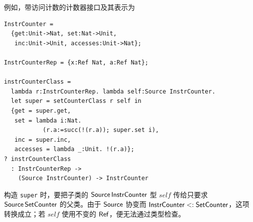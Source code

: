 例如，带访问计数的计数器接口及其表示为
\begin{lstlisting}
InstrCounter =
  {get:Unit->Nat, set:Nat->Unit,
   inc:Unit->Unit, accesses:Unit->Nat};

InstrCounterRep = {x:Ref Nat, a:Ref Nat};

instrCounterClass =
  lambda r:InstrCounterRep. lambda self:Source InstrCounter.
  let super = setCounterClass r self in
  {get = super.get,
   set = lambda i:Nat.
           (r.a:=succ(!(r.a)); super.set i),
   inc = super.inc,
   accesses = lambda _:Unit. !(r.a)};
? instrCounterClass
  : InstrCounterRep ->
    (Source InstrCounter) -> InstrCounter
\end{lstlisting}
构造 \texttt{super} 时，要把子类的
\(\mathsf{Source}\,\mathsf{InstrCounter}\) 型 \(self\) 传给只要求
\(\mathsf{Source}\,\mathsf{SetCounter}\) 的父类。由于
\(\mathsf{Source}\) 协变而
\(\mathsf{InstrCounter}<:\mathsf{SetCounter}\)，这项转换成立；若
\(self\) 使用不变的 \(\mathsf{Ref}\)，便无法通过类型检查。

